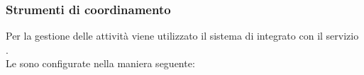 		 \subsubsection{Strumenti di coordinamento}
		Per la gestione delle attività viene utilizzato il sistema di  integrato con il servizio .\\
		Le  sono configurate nella maniera seguente:

